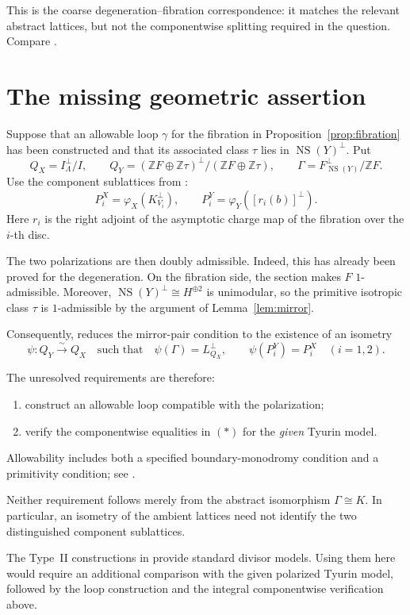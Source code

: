 \documentclass[11pt]{article}
\newcommand{\Z}{\mathbb Z}
\newcommand{\NS}{\operatorname{NS}}
\theoremstyle{remark}
\begin{document}
This is the coarse degeneration--fibration correspondence: it matches
the relevant abstract lattices, but not the componentwise splitting
required in the question.  Compare \cite[Proposition~4.1]{DHT17}.

\section{The missing geometric assertion}

Suppose that an allowable loop \(\gamma\) for the fibration in
Proposition~\ref{prop:fibration} has been constructed and that its
associated class \(\tau\) lies in \(\NS(Y)^\perp\).
Put
\[
 Q_X=I^\perp_\Lambda/I,\qquad
 Q_Y=(\Z F\oplus\Z\tau)^\perp/(\Z F\oplus\Z\tau),\qquad
 \Gamma=F^\perp_{\NS(Y)}/\Z F.
\]
Use the component sublattices from \cite[Definition~5.1]{GT24}:
\[
 P_i^X=\varphi_X(K_{V_i}^{\perp}),
 \qquad
 P_i^Y=\varphi_Y([r_i(b)]^{\perp}).
\]
Here \(r_i\) is the right adjoint of the asymptotic charge map of
the fibration over the \(i\)-th disc.

The two polarizations are then doubly admissible.
Indeed, this has already been proved for the degeneration.
On the fibration side, the section makes \(F\) \(1\)-admissible.
Moreover, \(\NS(Y)^\perp\cong H^{\oplus2}\) is unimodular, so the
primitive isotropic class \(\tau\) is \(1\)-admissible by the argument
of Lemma~\ref{lem:mirror}.

Consequently, \cite[Proposition~5.3]{GT24} reduces the mirror-pair
condition to the existence of an isometry
\[
 \psi:Q_Y\xrightarrow{\sim}Q_X
 \quad\text{such that}\quad
 \psi(\Gamma)=L^\perp_{Q_X},
 \qquad
 \psi(P_i^Y)=P_i^X\quad(i=1,2).
 \tag{*}
\]

The unresolved requirements are therefore:
\begin{enumerate}
 \item construct an allowable loop compatible with the polarization;
 \item verify the componentwise equalities in \((*)\) for the
       \emph{given} Tyurin model.
\end{enumerate}
Allowability includes both a specified boundary-monodromy condition
and a primitivity condition; see
\cite[Assumption~4.9 and Definition~4.11]{GT24}.

Neither requirement follows merely from the abstract isomorphism
\(\Gamma\cong K\).
In particular, an isometry of the ambient lattices need not identify
the two distinguished component sublattices.

The Type~II constructions in \cite[Section~7F]{ABE22} provide standard
divisor models.
Using them here would require an additional comparison with the
given polarized Tyurin model, followed by the loop construction and
the integral componentwise verification above.
\end{document}
